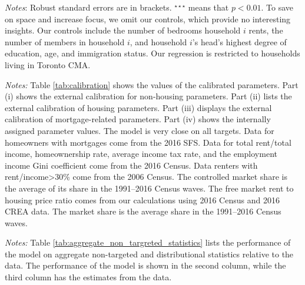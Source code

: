 \documentclass[parskip=full]{article}
\newenvironment{fignote2}[1]
{
\par
\medskip
\begin{minipage}{#1}
\footnotesize
}
{
\end{minipage}
}
\begin{document}
\begin{table}[H]
    \centering
    \caption{Income difference between renters in the controlled and free markets}
    \vspace{-0.5cm}
    \label{tab:renter_income_gap}
    
    \vspace{-0.5cm}
    \begin{fignote2}{0.4\textwidth}
    \textit{Notes}: Robust standard errors are in brackets. $^{\star\star\star}$ means that $p<0.01$. To save on space and increase focus, we omit our controls, which provide no interesting insights. Our controls include the number of bedrooms household $i$ rents, the number of members in household $i$, and household $i$'s head's highest degree of education, age, and immigration status. Our regression is restricted to households living in Toronto CMA.
    \end{fignote2}
\end{table}
    
\begin{table}[H]
    \centering
    \caption{Assigned parameter values}
    \vspace{-0.75cm}
    \label{tab:calibration}
    
    \vspace{-0.5cm}
    \begin{fignote2}{1.07\textwidth}
    \textit{Notes:} Table \ref{tab:calibration} shows the values of the calibrated parameters. Part (i) shows the external calibration for non-housing parameters. Part (ii) lists the external calibration of housing parameters. Part (iii) displays the external calibration of mortgage-related parameters. Part (iv) shows the internally assigned parameter values. The model is very close on all targets. Data for homeowners with mortgages come from the 2016 SFS. Data for total rent/total income, homeownership rate, average income tax rate, and the employment income Gini coefficient come from the 2016 Census. Data renters with rent/income>30\% come from the 2006 Census. The controlled market share is the average of its share in the 1991--2016 Census waves. The free market rent to housing price ratio comes from our calculations using 2016 Census and 2016 CREA data. The market share is the average share in the 1991--2016 Census waves.
    \end{fignote2}
\end{table}

\begin{table}[H]
    \centering
    \caption{Aggregate non-targeted statistics}
    \vspace{-0.5cm}
    \label{tab:aggregate_non_targreted_statistics}  
    \vspace{-0.45cm}
    \begin{fignote2}{0.96\textwidth}
      \textit{Notes:} Table \ref{tab:aggregate_non_targreted_statistics} lists the performance of the model on aggregate non-targeted and distributional statistics relative to the data. The performance of the model is shown in the second column, while the third column has the estimates from the data. 
    \end{fignote2}
\end{table}
\end{document}
